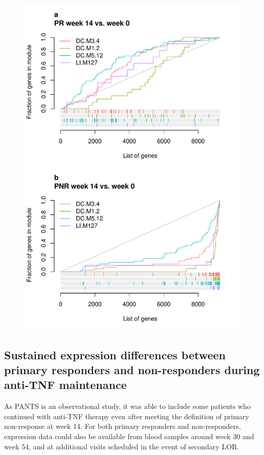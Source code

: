 \begin{outline}
\begin{figure}
    \centering
    \includegraphics[width=1.0\textwidth,page=1]{mainmatter/figures/chapter_04/plot_gene_set_enrichment.evidencePlots_C_3_1_Interferon.pdf}
    \caption{}
    \label{fig:multipants_dge_evidencePlots_C_3_1_Interferon}
\end{figure}

\subsection{Sustained expression differences between primary responders and non-responders during anti-\gls{TNF} maintenance}

As \gls{PANTS} is an observational study, it was able to include some patients who continued with anti-\gls{TNF} therapy
even after meeting the definition of primary non-response at week 14.
For both primary responders and non-responders, expression data could also be available from blood samples around week 30 and week 54, and at additional visits scheduled in the event of secondary LOR.


\end{outline}
